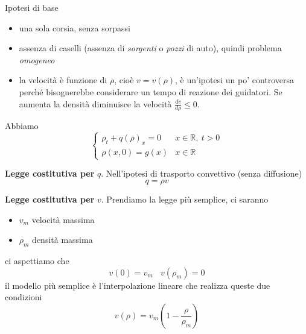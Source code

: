 \documentclass[10pt,a4paper,twoside,openright]{book}
\begin{document}
Ipotesi di base
\begin{itemize}
	\item una sola corsia, senza sorpassi
	\item assenza di caselli (assenza di \textit{sorgenti} o \textit{pozzi} di auto), quindi problema \emph{omogeneo}
	\item la velocità è funzione di $\rho $, cioè $v=v( \rho )$, è un'ipotesi un po' controversa perché bisognerebbe considerare un tempo di reazione dei guidatori. Se aumenta la densità diminuisce la velocità $\frac{dv}{d\rho } \leqslant 0$.
\end{itemize}

Abbiamo
\begin{equation}
	\begin{cases}
		\rho _{t} +q( \rho )_{x} =0 & x\in \mathbb{R} ,\ t >0 \\
		\rho ( x,0) =g( x)          & x\in \mathbb{R}         
	\end{cases}
\end{equation}


\textbf{Legge costitutiva per} $q$.
Nell'ipotesi di trasporto convettivo (senza diffusione)
\begin{equation}
	q=\rho v
\end{equation}

\textbf{Legge costitutiva per} $v$.
Prendiamo la legge più semplice, ci saranno
\begin{itemize}
	\item $v_{m}$ velocità massima
	\item $\rho _{m}$ densità massima
\end{itemize}

ci aspettiamo che
\begin{equation*}
	v( 0) =v_{m} \ \ \ \ v( \rho _{m}) =0
\end{equation*}
il modello più semplice è l'interpolazione lineare che realizza queste due condizioni
\begin{equation}
	v( \rho ) =v_{m}\left( 1-\frac{\rho }{\rho _{m}}\right)
\end{equation}
	
\end{document}
